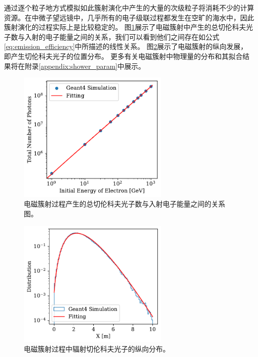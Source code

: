 通过逐个粒子地方式模拟如此簇射演化中产生的大量的次级粒子将消耗不少的计算资源。在中微子望远镜中，几乎所有的电子级联过程都发生在空旷的海水中，因此簇射演化的过程实际上是比较稳定的。
图\ref{fig:param_num_photon_vs_energy}展示了电磁簇射中产生的总切伦科夫光子数与入射的电子能量之间的关系，我们可以看到他们之间存在如公式\ref{eq:emission_efficiency}中所描述的线性关系。
图\ref{fig:param_X_distribution}展示了电磁簇射的纵向发展，即产生切伦科夫光子的位置分布。
更多有关电磁簇射中物理量的分布和其拟合结果将在附录\ref{appendix:shower_param}中展示。

\begin{figure}[!ht]
\centering
    \includegraphics[width=0.65\textwidth]{img/param_num_photon_vs_energy.pdf}
    \caption{电磁簇射过程产生的总切伦科夫光子数与入射电子能量之间的关系图。}
    \label{fig:param_num_photon_vs_energy}
\end{figure}

\begin{figure}[!ht]
\centering
    \includegraphics[width=0.65\textwidth]{img/param_X_distribution.pdf}
    \caption{电磁簇射过程中辐射切伦科夫光子的纵向分布。}
    \label{fig:param_X_distribution}
\end{figure}





